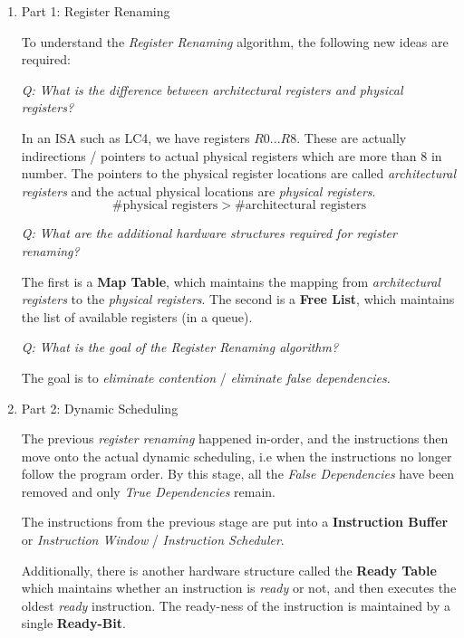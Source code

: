 \documentclass[12pt]{article}
\newenvironment{QandA}{\begin{enumerate}[label=\bfseries\arabic*.]\bfseries}
                      {\end{enumerate}}
\newenvironment{answered}{\par\quad\normalfont}{}
\begin{document}
\begin{QandA}
\item Part 1: Register Renaming
\begin{answered}
To understand the \textit{Register Renaming} algorithm, the following new ideas are required:

\textit{Q: What is the difference between architectural registers and physical registers?}

\quad In an ISA such as LC4, we have registers $R0...R8$. These are actually indirections / pointers to actual physical registers which are more than 8 in number. The pointers to the physical register locations are called \textit{architectural registers} and the actual physical locations are \textit{physical registers}.
\begin{equation*}
    \#\text{physical registers} > \#\text{architectural registers}
\end{equation*}

\textit{Q: What are the additional hardware structures required for register renaming?}

\quad The first is a \textbf{Map Table}, which maintains the mapping from \textit{architectural registers} to the \textit{physical registers}. The second is a \textbf{Free List}, which maintains the list of available registers (in a queue). 

\textit{Q: What is the goal of the Register Renaming algorithm?}

\quad The goal is to \textit{eliminate contention} / \textit{eliminate false dependencies}. 
\end{answered}

\item Part 2: Dynamic Scheduling
\begin{answered}
The previous \textit{register renaming} happened in-order, and the instructions then move onto the actual dynamic scheduling, i.e when the instructions no longer follow the program order. By this stage, all the \textit{False Dependencies} have been removed and only \textit{True Dependencies} remain. 

The instructions from the previous stage are put into a \textbf{Instruction Buffer} or \textit{Instruction Window} / \textit{Instruction Scheduler}. 

Additionally, there is another hardware structure called the \textbf{Ready Table} which maintains whether an instruction is \textit{ready} or not, and then executes the oldest \textit{ready} instruction. The ready-ness of the instruction is maintained by a single \textbf{Ready-Bit}. 


\end{answered}
\end{QandA}
\end{document}
